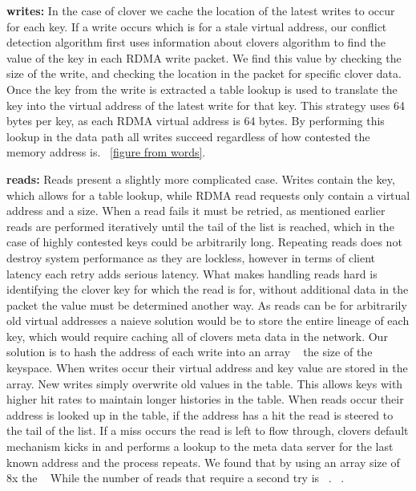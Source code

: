 \textbf{writes:} In the case of clover we cache the location of the latest writes to occur for
each key. If a write occurs which is for a stale virtual address, our conflict
detection algorithm first uses information about clovers algorithm to find the
value of the key in each RDMA write packet. We find this value by checking the
size of the write, and checking the location in the packet for specific clover
data. Once the key from the write is extracted a table lookup is used to
translate the key into the virtual address of the latest write for that key.
This strategy uses 64 bytes per key, as each RDMA virtual address is 64 bytes.
By performing this lookup in the data path all writes succeed regardless of how
contested the memory address is. ~\ref{figure from words}.

\textbf{reads:} Reads present a slightly more complicated case. Writes contain
the key, which allows for a table lookup, while RDMA read requests only contain
a virtual address and a size. When a read fails it must be retried, as mentioned
earlier reads are performed iteratively until the tail of the list is reached,
which in the case of highly contested keys could be arbitrarily long. Repeating
reads does not destroy system performance as they are lockless, however in terms
of client latency each retry adds serious latency. What makes handling reads
hard is identifying the clover key for which the read is for, without additional
data in the packet the value must be determined another way. As reads can be for
arbitrarily old virtual addresses a naieve solution would be to store the entire
lineage of each key, which would require caching all of clovers meta data in the
network. Our solution is to hash the address of each write into an array
~ the size of the keyspace. When writes occur their virtual address and
key value are stored in the array. New writes simply overwrite old values in the
table. This allows keys with higher hit rates to maintain longer histories in
the table. When reads occur their address is looked up in the table, if the
address has a hit the read is steered to the tail of the list. If a miss occurs
the read is left to flow through, clovers default mechanism kicks in and
performs a lookup to the meta data server for the last known address and the
process repeats. We found that by using an array size of 8x the ~ While the number of reads that require a
second try is ~. ~.

